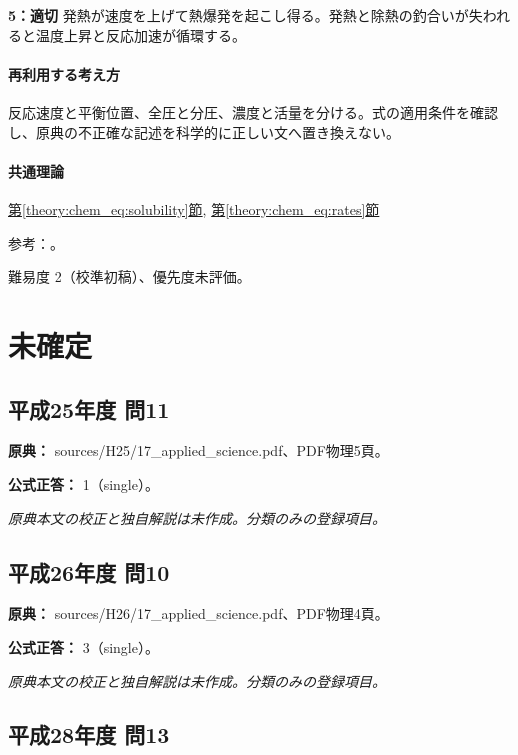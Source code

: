 \noindent\textbf{5：適切} 発熱が速度を上げて熱爆発を起こし得る。発熱と除熱の釣合いが失われると温度上昇と反応加速が循環する。\par

\paragraph{再利用する考え方} 反応速度と平衡位置、全圧と分圧、濃度と活量を分ける。式の適用条件を確認し、原典の不正確な記述を科学的に正しい文へ置き換えない。

\paragraph{共通理論} \hyperref[theory:chem_eq:solubility]{第\ref*{theory:chem_eq:solubility}節}, \hyperref[theory:chem_eq:rates]{第\ref*{theory:chem_eq:rates}節}

\par 参考：\cite{iupac_greenbook2012}。

\par 難易度 2（校準初稿）、優先度未評価。

\section{未確定}

\subsection{平成25年度 問11}
\label{q:h25-reg-applied-11}

\noindent\textbf{原典：} sources/H25/17\_applied\_science.pdf、PDF物理5頁。

\textbf{公式正答：} 1（single）。

\par\textit{原典本文の校正と独自解説は未作成。分類のみの登録項目。}

\subsection{平成26年度 問10}
\label{q:h26-reg-applied-10}

\noindent\textbf{原典：} sources/H26/17\_applied\_science.pdf、PDF物理4頁。

\textbf{公式正答：} 3（single）。

\par\textit{原典本文の校正と独自解説は未作成。分類のみの登録項目。}

\subsection{平成28年度 問13}
\label{q:h28-reg-applied-13}

